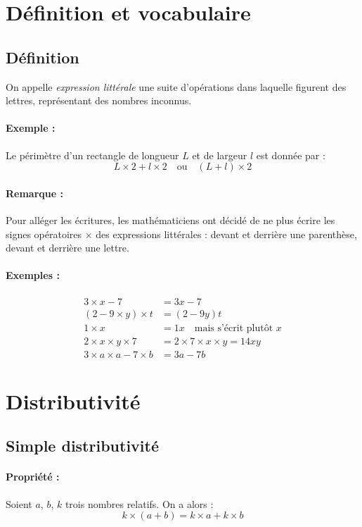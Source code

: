 \documentclass[11pt]{article}
\begin{document}
\section{Définition et vocabulaire}
\subsection{Définition}
On appelle \emph{expression littérale} une suite d'opérations dans laquelle figurent des lettres, représentant des nombres inconnus.

\paragraph{Exemple :}
Le périmètre d'un rectangle de longueur $L$ et de largeur $l$ est donnée par :
\[ L \times 2 + l \times 2 \quad \text{ou} \quad (L + l) \times 2 \]

\paragraph{Remarque :}
Pour alléger les écritures, les mathématiciens ont décidé de ne plus écrire les signes opératoires $\times$ des expressions littérales : devant et derrière une parenthèse, devant et derrière une lettre.

\paragraph{Exemples :}
\begin{align*}
3 \times x - 7 &= 3x - 7 \\
(2 - 9 \times y) \times t &= (2 - 9y)t \\
1 \times x &= 1x \quad \text{mais s'écrit plutôt } x \\
2 \times x \times y \times 7 &= 2 \times 7 \times x \times y = 14xy \\
3 \times a \times a - 7 \times b &= 3a - 7b
\end{align*}

\section{Distributivité}
\subsection{Simple distributivité}
\paragraph{Propriété :}
Soient $a$, $b$, $k$ trois nombres relatifs. On a alors :
\[ k \times (a + b) = k \times a + k \times b \]
\end{document}
